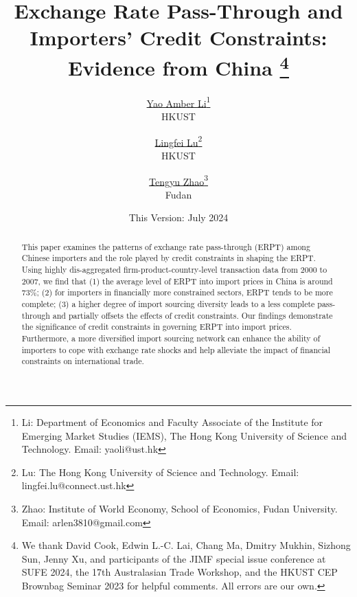 

\linespread{1.2}
\geometry{a4paper,scale=0.75}



\title{  \Large \textbf{Exchange Rate Pass-Through and Importers' Credit Constraints: Evidence from China} 
\thanks{We thank David Cook, Edwin L.-C. Lai, Chang Ma, Dmitry Mukhin, Sizhong Sun, Jenny Xu, and participants of the JIMF special issue conference at SUFE 2024, the 17th Australasian Trade Workshop, and the HKUST CEP Brownbag Seminar 2023 for helpful comments. All errors are our own.}}

\author{\large \href{http://yaoli.people.ust.hk/}{Yao Amber Li}\footnote{Li: Department of Economics and Faculty Associate of the Institute for Emerging Market Studies (IEMS), The Hong Kong University of Science and Technology. Email: yaoli@ust.hk}\\ {HKUST}
\and \href{}{Lingfei Lu}\footnote{Lu: The Hong Kong University of Science and Technology. Email: lingfei.lu@connect.ust.hk} \\ {HKUST} 
\and \href{}{Tengyu Zhao}\footnote{Zhao: Institute of World Economy, School of Economics, Fudan University. Email: arlen3810@gmail.com} \\ {Fudan} }

\date{This Version: July 2024}

\maketitle

\begin{abstract}
This paper examines the patterns of exchange rate pass-through (ERPT) among Chinese importers and the role played by credit constraints in shaping the ERPT. Using highly dis-aggregated firm-product-country-level transaction data from 2000 to 2007, we find that (1) the average level of ERPT into import prices in China is around 73\%; (2) for importers in financially more constrained sectors, ERPT tends to be more complete; (3) a higher degree of import sourcing diversity leads to a less complete pass-through and partially offsets the effects of credit constraints. Our findings demonstrate the significance of credit constraints in governing ERPT into import prices. Furthermore, a more diversified import sourcing network can enhance the ability of importers to cope with exchange rate shocks and help alleviate the impact of financial constraints on international trade.

\end{abstract}


